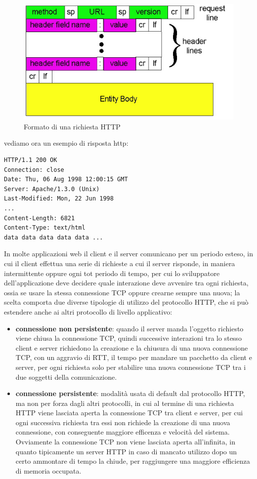 \documentclass[a4paper,12pt, oneside]{book}
\begin{document}
\begin{figure}
    \caption{Formato di una richiesta HTTP}
    \label{fig:httpStructure}
	\includegraphics[scale=0.7]{img/http2.png}
\end{figure}
vediamo ora un esempio di risposta http:
\begin{verbatim}
HTTP/1.1 200 OK
Connection: close
Date: Thu, 06 Aug 1998 12:00:15 GMT
Server: Apache/1.3.0 (Unix)
Last-Modified: Mon, 22 Jun 1998
...
Content-Length: 6821
Content-Type: text/html
data data data data data ...
\end{verbatim}
In molte applicazioni web il client e il server comunicano per un periodo esteso, in cui il client
effettua una serie di richieste a cui il server risponde, in maniera intermittente oppure ogni tot 
periodo di tempo, per cui lo sviluppatore dell'applicazione deve decidere quale interazione deve
avvenire tra ogni richiesta, ossia se usare la stessa connessione TCP oppure crearne sempre una nuova;
la scelta comporta due diverse tipologie di utilizzo del protocollo HTTP, che si può estendere anche ai 
altri protocollo di livello applicativo:
\begin{itemize}
    \item \textbf{connessione non persistente}: quando il server manda l'oggetto richiesto viene 
        chiusa la connessione TCP, quindi successive interazioni tra lo stesso client e server richiedono
        la creazione e la chiusura di una nuova connessione TCP, con un aggravio di RTT, il tempo
        per mandare un pacchetto da client e server, per ogni richiesta solo per stabilire una nuova
        connessione TCP tra i due soggetti della comunicazione.

    \item \textbf{connessione persistente}: modalità usata di default dal protocollo HTTP, ma non per forza
        dagli altri protocolli, in cui al termine di una richiesta HTTP viene lasciata aperta la connessione
        TCP tra client e server, per cui ogni successiva richiesta tra essi non richiede la creazione
        di una nuova connessione, con conseguente maggiore efficenza e velocità del sistema.\newline
        Ovviamente la connessione TCP non viene lasciata aperta all'infinita, in quanto tipicamente 
        un server HTTP in caso di mancato utilizzo dopo un certo ammontare di tempo la chiude, per 
        raggiungere una maggiore efficienza di memoria occupata.
\end{itemize}
\end{document}
